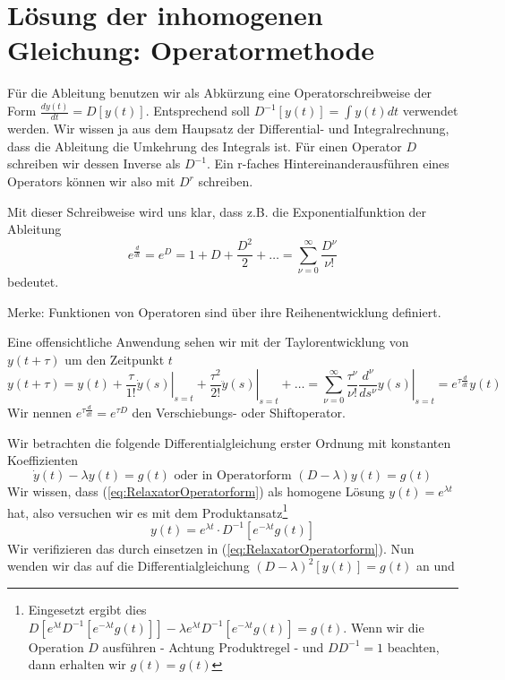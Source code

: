 \section{Lösung der inhomogenen Gleichung: Operatormethode}
Für die Ableitung benutzen wir als Abkürzung eine Operatorschreibweise der Form
$\frac{dy(t)}{dt}=D[y(t)]$. Entsprechend soll $D^{-1}[y(t)]=\int y(t)dt$
verwendet werden. Wir wissen ja aus dem Haupsatz der Differential- und
Integralrechnung, dass die Ableitung die Umkehrung des Integrals ist. Für einen
Operator $D$ schreiben wir dessen Inverse als $D^{-1}$. Ein r-faches
Hintereinanderausführen eines Operators können wir also mit $D^r$ schreiben.
\begin{note}{}
  Mit dieser Schreibweise wird uns klar, dass z.B. die Exponentialfunktion der
  Ableitung
  \[e^\frac{d}{dt}=e^D=1+D+\frac{D^2}{2}+\dots=\sum_{\nu=0}^\infty\frac{D^\nu}{\nu!}\]
  bedeutet. 
  
  Merke: Funktionen von Operatoren sind über ihre Reihenentwicklung
  definiert.

  Eine offensichtliche Anwendung sehen wir mit der Taylorentwicklung von
  $y(t+\tau)$ um den Zeitpunkt $t$
  \[y(t+\tau)=y(t)+\left.\frac{\tau}{1!}\dot{y}(s)\right|_{s=t}+\left.\frac{\tau^2}{2!}\ddot{y}(s)\right|_{s=t}
	+\dots=\sum\limits_{\nu=0}^{\infty}\left.\frac{\tau^\nu}{\nu!}\frac{d^\nu}{ds^\nu}y(s)\right|_{s=t}=
	e^{\tau\frac{d}{dt}}y(t)\]
  Wir nennen $e^{\tau\frac{d}{dt}}=e^{\tau D}$ den Verschiebungs- oder
  Shiftoperator.
\end{note}
Wir betrachten die folgende Differentialgleichung erster Ordnung mit konstanten
Koeffizienten 
\begin{equation}
  \dot{y}(t)-\lambda y(t)=g(t)\mbox{ oder in Operatorform }(D-\lambda)y(t)=g(t)
  \label{eq:RelaxatorOperatorform}
\end{equation}
Wir wissen, dass (\ref{eq:RelaxatorOperatorform}) als homogene Lösung
$y(t)=e^{\lambda t}$ hat, also versuchen wir es mit dem
Produktansatz\footnote[1]{Eingesetzt ergibt dies $D[e^{\lambda
t}D^{-1}[e^{-\lambda t}g(t)]]-\lambda e^{\lambda t}D^{-1}[e^{-\lambda
t}g(t)]=g(t)$. Wenn wir die Operation $D$ ausführen - Achtung Produktregel -
und $DD^{-1}=1$ beachten, dann erhalten wir $g(t)=g(t)$}
\begin{equation}
  y(t)=e^{\lambda t}\cdot D^{-1}[e^{-\lambda t}g(t)]
  \label{eq:Produktansatz}
\end{equation}
Wir verifizieren das durch einsetzen in (\ref{eq:RelaxatorOperatorform}). Nun
wenden wir das auf die Differentialgleichung $(D-\lambda)^2[y(t)]=g(t)$ an und
